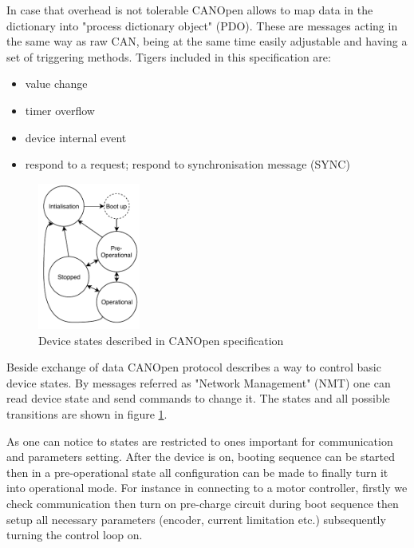 In case that overhead is not tolerable CANOpen allows to map data in the dictionary into "process dictionary object" (PDO). These are messages acting in the same way as raw CAN, being at the same time easily adjustable and having a set of triggering methods.
Tigers included in this specification are:
\begin{itemize}
	\item value change
	\item timer overflow
	\item device internal event
	\item respond to a request; respond to synchronisation message (SYNC)
\end{itemize}

\begin{figure}
    \vspace{-0.9cm}
    \begin{center}
       \includegraphics[width=0.3\textwidth]{figures/CANOpen_NMT}
    \end{center}
    \vspace{-0.5cm}
    \caption{Device states described in CANOpen specification}
    \label{fig:CANOpen NMT}
\end{figure}
Beside exchange of data CANOpen protocol describes a way to control basic device states. By messages referred as "Network Management" (NMT) one can read device state and send commands to change it. The states and all possible transitions are shown in figure \ref{fig:CANOpen NMT}.

As one can notice to states are restricted to ones important for communication and parameters setting. After the device is on, booting sequence can be started then in a pre-operational state all configuration can be made to finally turn it into operational mode. For instance in connecting to a motor controller, firstly we check communication then turn on pre-charge circuit during boot sequence then setup all necessary parameters (encoder, current limitation etc.) subsequently turning the control loop on.

